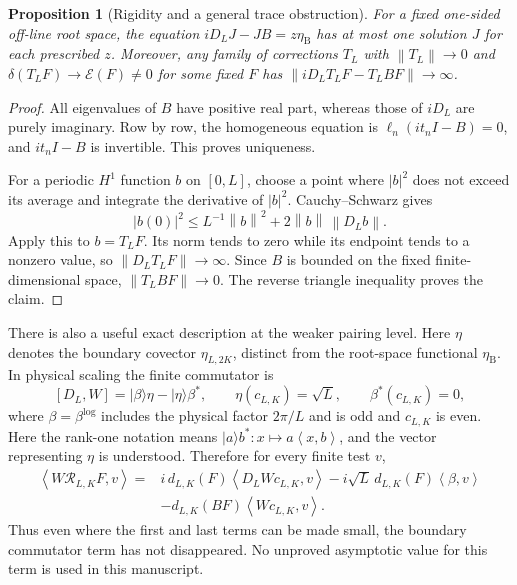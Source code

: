 \documentclass[11pt]{article}
\newtheorem{proposition}[theorem]{Proposition}
\theoremstyle{remark}
\newcommand{\norm}[1]{\left\lVert #1\right\rVert}
\newcommand{\ip}[2]{\left\langle #1,#2\right\rangle}
\newcommand{\E}{\mathscr E}
\begin{document}
\begin{proposition}[Rigidity and a general trace obstruction]\label{v1:prop:graph}
For a fixed one-sided off-line root space, the equation
$iD_LJ-JB=z\eta_{\mathrm B}$ has at most one solution $J$ for each prescribed $z$.
Moreover, any family of corrections $T_L$ with $\norm{T_L}\to0$ and
$\delta(T_LF)\to\E(F)\ne0$ for some fixed $F$ has
$\norm{iD_LT_LF-T_LBF}\to\infty$.
\end{proposition}
\begin{proof}
All eigenvalues of $B$ have positive real part, whereas those of $iD_L$
are purely imaginary. Row by row, the homogeneous equation is
$\ell_n(it_nI-B)=0$, and $it_nI-B$ is invertible. This proves uniqueness.

For a periodic $H^1$ function $b$ on $[0,L]$, choose a point where
$|b|^2$ does not exceed its average and integrate the derivative of
$|b|^2$. Cauchy--Schwarz gives
\begin{equation}\label{v1:eq:trace}
 |b(0)|^2\le L^{-1}\norm b^2+2\norm b\,\norm{D_Lb}.
\end{equation}
Apply this to $b=T_LF$. Its norm tends to zero while its endpoint tends
to a nonzero value, so $\norm{D_LT_LF}\to\infty$.
Since $B$ is bounded on the fixed finite-dimensional space,
$\norm{T_LBF}\to0$. The reverse triangle inequality proves the claim.
\end{proof}

There is also a useful exact description at the weaker pairing level.
Here $\eta$ denotes the boundary covector $\eta_{L,2K}$, distinct from
the root-space functional $\eta_{\mathrm B}$. In physical scaling the finite commutator is
\[
 [D_L,W]=|\beta\rangle\eta- |\eta\rangle\beta^*,
 \qquad \eta(c_{L,K})=\sqrt L,\qquad \beta^*(c_{L,K})=0,
\]
where $\beta=\beta^{\log}$ includes the physical factor $2\pi/L$ and is odd and $c_{L,K}$ is even. Here the rank-one notation
means $|a\rangle b^*:x\mapsto a\ip{x}{b}$, and the vector representing
$\eta$ is understood. Therefore for every finite test $v$,
\begin{equation}\label{v1:eq:paireddefect}
 \begin{split}
 \ip{W\mathcal R_{L,K}F}{v}
 ={}&i\,d_{L,K}(F)\ip{D_LWc_{L,K}}{v}
       -i\sqrt L\,d_{L,K}(F)\ip{\beta}{v}\\
    &-d_{L,K}(BF)\ip{Wc_{L,K}}{v}.
 \end{split}
\end{equation}
Thus even where the first and last terms can be made small, the boundary
commutator term has not disappeared. No unproved asymptotic value for this
term is used in this manuscript.
\end{document}
